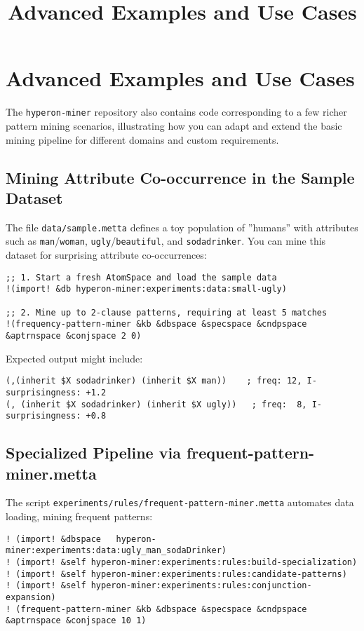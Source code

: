\documentclass{article}
\title{Advanced Examples and Use Cases}
\begin{document}
\section{Advanced Examples and Use Cases}

The \texttt{hyperon-miner} repository also contains code corresponding to a few richer pattern mining scenarios, illustrating how you can adapt and extend the basic mining pipeline for different domains and custom requirements.

\subsection{Mining Attribute Co-occurrence in the Sample Dataset}

The file \texttt{data/sample.metta} defines a toy population of ''humans'' with attributes such as \texttt{man}/\texttt{woman}, \texttt{ugly}/\texttt{beautiful}, and \texttt{sodadrinker}.  You can mine this dataset for surprising attribute co-occurrences:

\begin{verbatim}
;; 1. Start a fresh AtomSpace and load the sample data
!(import! &db hyperon-miner:experiments:data:small-ugly)

;; 2. Mine up to 2-clause patterns, requiring at least 5 matches
!(frequency-pattern-miner &kb &dbspace &specspace &cndpspace &aptrnspace &conjspace 2 0)

\end{verbatim}

Expected output might include:

\begin{verbatim}
(,(inherit $X sodadrinker) (inherit $X man))    ; freq: 12, I-surprisingness: +1.2
(, (inherit $X sodadrinker) (inherit $X ugly))   ; freq:  8, I-surprisingness: +0.8
\end{verbatim}

\subsection{Specialized Pipeline via frequent-pattern-miner.metta}

The script \texttt{experiments/rules/frequent-pattern-miner.metta} automates data loading, mining frequent patterns:

\begin{verbatim}
! (import! &dbspace   hyperon-miner:experiments:data:ugly_man_sodaDrinker)
! (import! &self hyperon-miner:experiments:rules:build-specialization)
! (import! &self hyperon-miner:experiments:rules:candidate-patterns)
! (import! &self hyperon-miner:experiments:rules:conjunction-expansion)
! (frequent-pattern-miner &kb &dbspace &specspace &cndpspace &aptrnspace &conjspace 10 1)
\end{verbatim}
\end{document}
